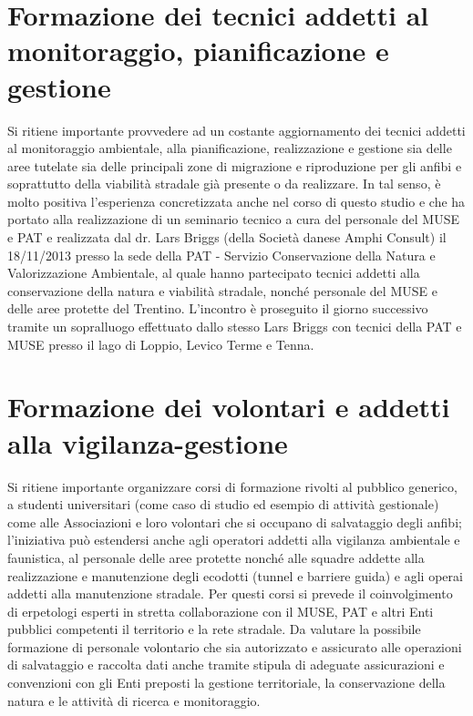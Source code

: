 \documentclass[11pt,a4paper,twoside]{memoir}
\begin{document}
\section{Formazione dei tecnici addetti al monitoraggio, pianificazione e gestione}
Si ritiene importante provvedere ad un costante aggiornamento dei tecnici addetti al monitoraggio ambientale, alla pianificazione, realizzazione e gestione sia delle aree tutelate sia delle principali zone di migrazione e riproduzione per gli anfibi e soprattutto della viabilità stradale già presente o da realizzare. In tal senso, è molto positiva l'esperienza concretizzata anche nel corso di questo studio e che ha portato alla realizzazione di un seminario tecnico a cura del personale del MUSE e PAT e realizzata dal dr. Lars Briggs (della Società danese Amphi Consult) il 18/11/2013 presso la sede della PAT - Servizio Conservazione della Natura e Valorizzazione Ambientale, al quale hanno partecipato tecnici addetti alla conservazione della natura e viabilità stradale, nonché personale del MUSE e delle aree protette del Trentino. L'incontro è proseguito il giorno successivo tramite un sopralluogo effettuato dallo stesso Lars Briggs con tecnici della PAT e MUSE presso il lago di Loppio, Levico Terme e Tenna.

\section{Formazione dei volontari e addetti alla vigilanza-gestione}
Si ritiene importante organizzare corsi di formazione rivolti al pubblico generico, a studenti universitari (come caso di studio ed esempio di attività gestionale) come alle Associazioni e loro volontari che si occupano di salvataggio degli anfibi; l'iniziativa può estendersi anche agli operatori addetti alla vigilanza ambientale e faunistica, al personale delle aree protette nonché alle squadre addette alla realizzazione e manutenzione degli ecodotti (tunnel e barriere guida) e agli operai addetti alla manutenzione stradale. 
Per questi corsi si prevede il coinvolgimento di erpetologi esperti in stretta collaborazione con il MUSE, PAT e altri Enti pubblici competenti il territorio e la rete stradale.
Da valutare la possibile formazione di personale volontario che sia autorizzato e assicurato alle operazioni di salvataggio e raccolta dati anche tramite stipula di adeguate assicurazioni e convenzioni con gli Enti preposti la gestione territoriale, la conservazione della natura e le attività di ricerca e monitoraggio.
\end{document}
